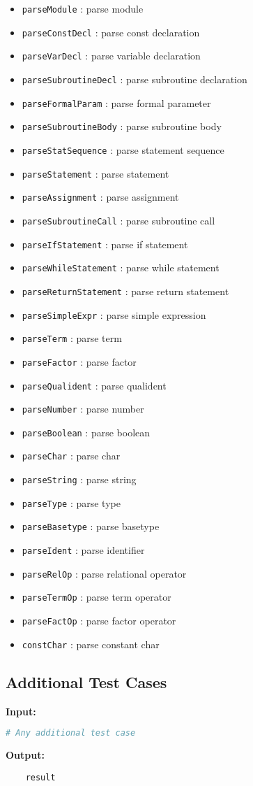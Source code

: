 \documentclass[12pt]{article}
\begin{document}
\begin{itemize}
    \item \texttt{parseModule} : parse module
    \item \texttt{parseConstDecl} : parse const declaration
    \item \texttt{parseVarDecl} : parse variable declaration
    \item \texttt{parseSubroutineDecl} : parse subroutine declaration
    \item \texttt{parseFormalParam} : parse formal parameter
    \item \texttt{parseSubroutineBody} : parse subroutine body
    \item \texttt{parseStatSequence} : parse statement sequence
    \item \texttt{parseStatement} : parse statement
    \item \texttt{parseAssignment} : parse assignment
    \item \texttt{parseSubroutineCall} : parse subroutine call
    \item \texttt{parseIfStatement} : parse if statement
    \item \texttt{parseWhileStatement} : parse while statement
    \item \texttt{parseReturnStatement} : parse return statement
    \item \texttt{parseSimpleExpr} : parse simple expression
    \item \texttt{parseTerm} : parse term
    \item \texttt{parseFactor} : parse factor
    \item \texttt{parseQualident} : parse qualident
    \item \texttt{parseNumber} : parse number
    \item \texttt{parseBoolean} : parse boolean
    \item \texttt{parseChar} : parse char
    \item \texttt{parseString} : parse string
    \item \texttt{parseType} : parse type
    \item \texttt{parseBasetype} : parse basetype
    \item \texttt{parseIdent} : parse identifier
    \item \texttt{parseRelOp} : parse relational operator
    \item \texttt{parseTermOp} : parse term operator
    \item \texttt{parseFactOp} : parse factor operator
    \item \texttt{constChar} : parse constant char
\end{itemize}
\subsection{Additional Test Cases}
\textbf{Input:}
\begin{lstlisting}[language=Python]
    # Any additional test case
\end{lstlisting}

\textbf{Output:}
\begin{verbatim}
    result
\end{verbatim}
\end{document}
